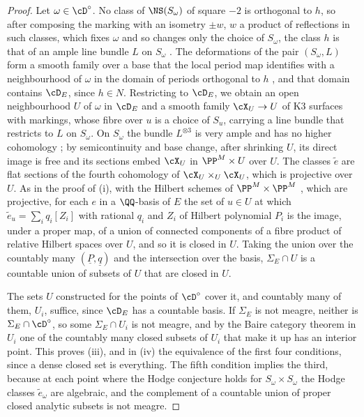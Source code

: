 \begin{proof}
Let $\omega\in\cD^{\circ}$. No class of $\NS(S_{\omega})$ of square $-2$ is
orthogonal to $h$, so after composing the marking with an isometry $\pm w$,
$w$ a product of reflections in such classes, which fixes $\omega$ and so
changes only the choice of $S_{\omega}$, the class $h$ is that of an ample
line bundle $L$ on $S_{\omega}$ \cite[Ch.~8]{Huy16}. The deformations of the
pair $(S_{\omega},L)$ form a smooth family over a base that the local period
map identifies with a neighbourhood of $\omega$ in the domain of periods
orthogonal to $h$ \cite[Ch.~6]{Huy16}, and that domain contains $\cD_{E}$,
since $h\in N$. Restricting to $\cD_{E}$, we obtain an open neighbourhood $U$
of $\omega$ in $\cD_{E}$ and a smooth family $\cX_{U}\to U$ of K3 surfaces with
markings, whose fibre over $u$ is a choice of $S_{u}$, carrying a line bundle
that restricts to $L$ on $S_{\omega}$. On $S_{\omega}$ the bundle
$L^{\otimes3}$ is very ample and has no higher cohomology
\cite[Ch.~2]{Huy16}; by semicontinuity and base change, after shrinking $U$,
its direct image is free and its sections embed $\cX_{U}$ in
$\PP^{M}\times U$ over $U$. The classes $\tilde e$ are flat sections of the
fourth cohomology of $\cX_{U}\times_{U}\cX_{U}$, which is projective over $U$.
As in the proof of (i), with the Hilbert schemes of
$\PP^{M}\times\PP^{M}$ \cite{Gro61}, which are projective, for each $e$ in a
$\QQ$-basis of $E$ the set of $u\in U$ at which
$\tilde e_{u}=\sum_{i}q_{i}[Z_{i}]$ with rational $q_{i}$ and $Z_{i}$ of
Hilbert polynomial $P_{i}$ is the image, under a proper map, of a union of
connected components of a fibre product of relative Hilbert spaces over $U$,
and so it is closed in $U$. Taking the union over the countably many
$(\underline{P},\underline{q})$ and the intersection over the basis,
$\Sigma_{E}\cap U$ is a countable union of subsets of $U$ that are closed in
$U$.

The sets $U$ constructed for the points of $\cD^{\circ}$ cover it, and
countably many of them, $U_{i}$, suffice, since $\cD_{E}$ has a countable
basis. If $\Sigma_{E}$ is not meagre, neither is
$\Sigma_{E}\cap\cD^{\circ}$, so some $\Sigma_{E}\cap U_{i}$ is not meagre, and
by the Baire category theorem in $U_{i}$ one of the countably many closed
subsets of $U_{i}$ that make it up has an interior point. This proves (iii),
and in (iv) the equivalence of the first four conditions, since a dense
closed set is everything. The fifth condition implies the third, because at
each point where the Hodge conjecture holds for $S_{\omega}\times S_{\omega}$
the Hodge classes $\tilde e_{\omega}$ are algebraic, and the complement of a
countable union of proper closed analytic subsets is not meagre.


\end{proof}
